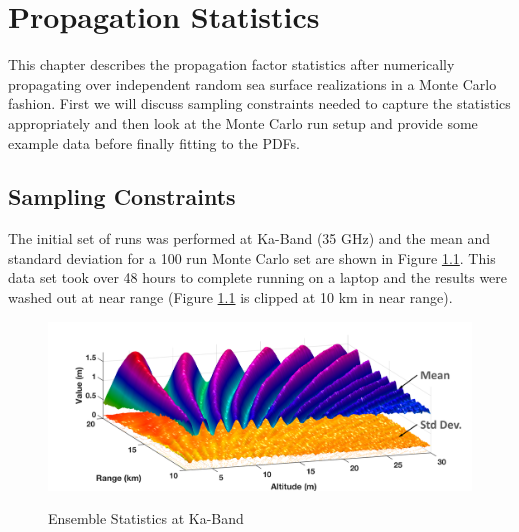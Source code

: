 \renewcommand{\baselinestretch}{2} \small\normalsize
\chapter{Propagation Statistics}
This chapter describes the propagation factor statistics after numerically propagating over independent random sea surface realizations in a Monte Carlo fashion. First we will discuss sampling constraints needed to capture the statistics appropriately and then look at the Monte Carlo run setup and provide some example data before finally fitting to the PDFs.

\section{Sampling Constraints}
The initial set of runs was performed at Ka-Band (35 GHz) and the mean and standard deviation for a 100 run Monte Carlo set are shown in Figure \ref{stat_fig:1}. This data set took over 48 hours to complete running on a laptop and the results were washed out at near range (Figure \ref{stat_fig:1} is clipped at 10 km in near range).

\begin{figure}[H]
  \begin{center}
\includegraphics[width=5in]{../media/statistics/ka_band_stats.png}
  \end{center}
  \renewcommand{\baselinestretch}{1} \small\normalsize
  \begin{quote}
    \caption[Ensemble Statistics at Ka-Band]{Ensemble Statistics at Ka-Band\label{stat_fig:1}}
  \end{quote}
\end{figure}
\renewcommand{\baselinestretch}{2} \small\normalsize


